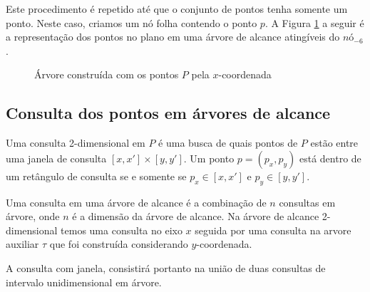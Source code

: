 Este procedimento é repetido até que o conjunto de pontos tenha somente um ponto. Neste caso, criamos um nó folha contendo o ponto $p$. A Figura \ref{fig:11} a seguir é a representação dos pontos no plano em uma árvore de alcance atingíveis do $nó_{-6}$.

\begin{figure}[h!]

 \caption{Árvore construída com os pontos $P$ pela $x$-coordenada}
 \label{fig:11}
\end{figure}

\subsection{Consulta dos pontos em árvores de alcance}

Uma consulta 2-dimensional em $P$ é uma busca de quais pontos de $P$ estão entre uma janela de consulta
$[x, x'] \times [y, y']$. Um ponto $p = (p_x, p_y)$ está dentro de um retângulo de consulta se e somente
se $p_x \in [x, x']$ e $p_y \in [y, y']$. \cite{cg_rt1}

Uma consulta em uma árvore de alcance é a combinação de $n$ consultas em árvore, onde $n$ é a dimensão
da árvore de alcance.
Na árvore de alcance 2-dimensional temos uma consulta no eixo $x$ seguida por uma consulta na arvore 
auxiliar $\tau$ que foi construída considerando $y$-coordenada.

A consulta com janela, consistirá portanto na união de duas consultas de intervalo unidimensional em
árvore.

